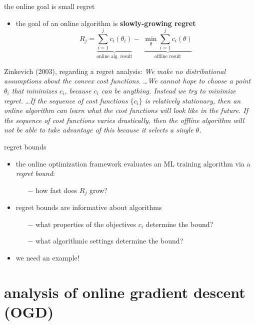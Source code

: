 \documentclass[svgnames,
               hyperref={colorlinks,citecolor=DeepPink4,linkcolor=FireBrick,urlcolor=Maroon},
               usepdftitle=false]  %
               {beamer}
\begin{document}
\begin{frame}{the online goal is small regret}

\begin{itemize}
\item the goal of an online algorithm is \textbf{slowly-growing regret}
  $$R_j = \underbrace{\sum_{i=1}^j c_i(\theta_i)}_{\text{online alg.~result}} - \,\, \underbrace{\min_\theta \sum_{i=1}^j c_i(\theta)}_{\text{offline result}}$$
\end{itemize}

Zinkevich (2003), regarding a regret analysis:  \quad \emph{We make \alert{no distributional assumptions} about the convex cost functions.} \dots \emph{We cannot hope to choose a point $\theta_i$ that minimizes $c_i$, because $c_i$ can be anything. Instead we try to \alert{minimize regret}.} \dots \emph{If the sequence of cost functions $\{c_i\}$ is relatively stationary, then an online algorithm can learn what the cost functions will look like in the future.  If the sequence of cost functions varies drastically, then the offline algorithm will not be able to take advantage of this because it selects a single $\theta$.}

\end{frame}


\begin{frame}{regret bounds}

\begin{itemize}
\item the online optimization framework evaluates an ML training algorithm via a \emph{regret bound}:
    \begin{itemize}
    \item[$-$] how fast does $R_j$ grow?
    \end{itemize}
\item regret bounds are informative about algorithms
    \begin{itemize}
    \item[$-$] what properties of the objectives $c_i$ determine the bound?
    \item[$-$] what algorithmic settings determine the bound?
    \end{itemize}
\item we need an example!
\end{itemize}
\end{frame}


\section{analysis of online gradient descent (OGD)}
\end{document}
